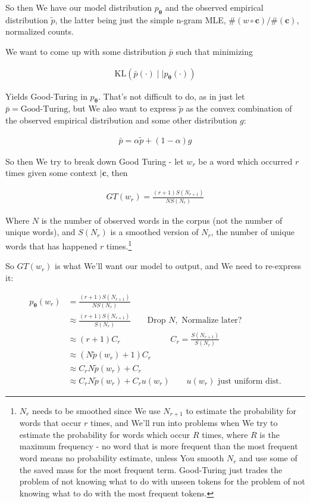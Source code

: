 \documentclass{article}
\newcommand{\KL}{\mathrm{KL}}
\newcommand{\vtheta}{\boldsymbol{\theta}}
\newcommand{\model}{p_{\vtheta}}
\newcommand{\context}{\boldsymbol{c}}
\begin{document}
	    So then We have our model distribution $\model$ and the observed empirical distribution $\tilde{p}$, the latter being just the simple n-gram MLE, $\#(w\circ\context)/\#(\context)$, normalized counts.
	    
	    We want to come up with some distribution $\bar{p}$ such that minimizing
	    
	    \begin{align}
	    	\KL(\bar{p}(\cdot) \mid\mid \model(\cdot))
	    \end{align}
	    
	    Yields Good-Turing in $\model$. That's not difficult to do, as in just let $\bar{p} = \text{Good-Turing}$, but We also want to express $\tilde{p}$ as the convex combination of the observed empirical distribution and some other distribution $g$:
	    
	    \begin{align}
	    	\bar{p} = \alpha\tilde{p} + (1-\alpha)g
	    \end{align}
	    
	    So then We try to break down Good Turing - let $w_r$ be a word which occurred $r$ times given some context $|\context$, then
	    
	    \begin{align}
	    	GT(w_r) = \frac{(r+1)S(N_{r+1})}{NS(N_r)}
	    \end{align}
	    
	    Where $N$ is the number of observed words in the corpus (not the number of unique words), and $S(N_r)$ is a smoothed version of $N_r$, the number of unique words that has happened $r$ times.\footnote{$N_r$ needs to be smoothed since We use $N_{r+1}$ to estimate the probability for words that occur $r$ times, and We'll run into problems when We try to estimate the probability for words which occur $R$ times, where $R$ is the maximum frequency - no word that is more frequent than the most frequent word means no probability estimate,  unless You smooth $N_r$ and use some of the saved mass for the most frequent term. Good-Turing just trades the problem of not knowing what to do with unseen tokens for the problem of not knowing what to do with the most frequent tokens.}
	    
	    So $GT(w_r)$ is what We'll want our model to output, and We need to re-express it:
	    
	    \begin{align}
	    	\model(w_r) &= \frac{(r+1)S(N_{r+1})}{NS(N_r)} \\
	    	&\approx  \frac{(r+1)S(N_{r+1})}{S(N_r)}\qquad\text{Drop } N,\text{ Normalize later?}\\
	    	&\approx (r+1)C_r \qquad\qquad\qquad C_r=\frac{S(N_{r+1})}{S(N_r)}\\
	    	&\approx (N\tilde{p}(w_r)+1)C_r \\
	    	&\approx C_r N\tilde{p}(w_r) + C_r \\
	    	&\approx C_r N\tilde{p}(w_r) + C_r u(w_r)\qquad u(w_r)\text{ just uniform dist.} 
	    \end{align}
	    
\end{document}
